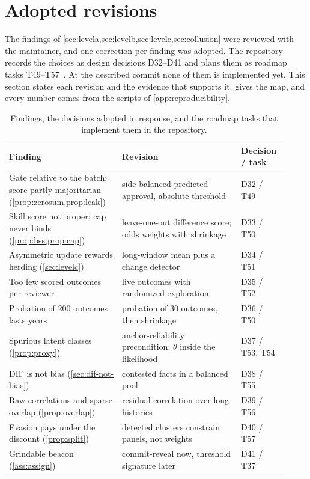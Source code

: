 \section{Adopted revisions}\label{sec:revisions}

The findings of \cref{sec:levela,sec:levelb,sec:levelc,sec:collusion} were reviewed with the
maintainer, and one correction per finding was adopted. The repository records the choices as
design decisions D32--D41 and plans them as roadmap tasks T49--T57~\cite{isegoria-repo}. At the
described commit none of them is implemented yet. This section states each revision and the
evidence that supports it.  gives the map, and every number comes from the
 scripts of \cref{app:reproducibility}.

\begin{table}[t]
\centering\small
\caption{Findings, the decisions adopted in response, and the roadmap tasks that implement
them in the repository.}
\label{tab:revisions}
\begin{tabular}{@{}>{\raggedright\arraybackslash}p{0.38\linewidth}>{\raggedright\arraybackslash}p{0.40\linewidth}>{\raggedright\arraybackslash}p{0.14\linewidth}@{}}
\toprule
Finding & Revision & Decision / task\\
\midrule
Gate relative to the batch; score partly majoritarian (\cref{prop:zerosum,prop:leak}) & side-balanced predicted approval, absolute threshold & D32 / T49\\
Skill score not proper; cap never binds (\cref{prop:bss,prop:cap}) & leave-one-out difference score; odds weights with shrinkage & D33 / T50\\
Asymmetric update rewards herding (\cref{sec:levelc}) & long-window mean plus a change detector & D34 / T51\\
Too few scored outcomes per reviewer & live outcomes with randomized exploration & D35 / T52\\
Probation of 200 outcomes lasts years & probation of 30 outcomes, then shrinkage & D36 / T50\\
Spurious latent classes (\cref{prop:proxy}) & anchor-reliability precondition; $\theta$ inside the likelihood & D37 / T53, T54\\
DIF is not bias (\cref{sec:dif-not-bias}) & contested facts in a balanced pool & D38 / T55\\
Raw correlations and sparse overlap (\cref{prop:overlap}) & residual correlation over long histories & D39 / T56\\
Evasion pays under the discount (\cref{prop:split}) & detected clusters constrain panels, not weights & D40 / T57\\
Grindable beacon (\cref{ass:assign}) & commit-reveal now, threshold signature later & D41 / T37\\
\bottomrule
\end{tabular}
\end{table}

